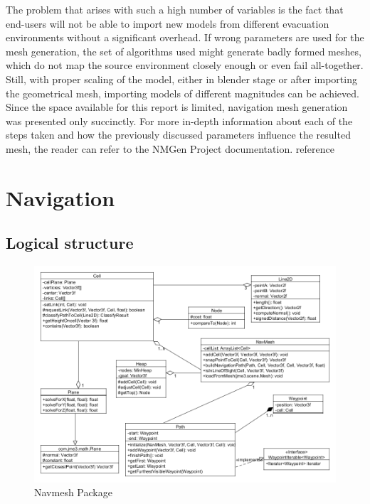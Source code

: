 The problem that arises with such a high number of variables is the fact that end-users will not be able to import new models from different evacuation environments without a significant overhead. If wrong parameters are used for the mesh generation, the set of algorithms used might generate badly formed meshes, which do not map the source environment closely enough or even fail all-together.
Still, with proper scaling of the model, either in blender stage or after importing the geometrical mesh, importing models of different magnitudes can be achieved.
Since the space available for this report is limited, navigation mesh generation was presented only succinctly. For more in-depth information about each of the steps taken and how the previously discussed parameters influence the resulted mesh, the reader can refer to the NMGen Project documentation. {reference}
\section{Navigation}

\subsection{Logical structure}

\begin{figure}[H]
	\centering
	\includegraphics[width=1\textwidth]{../images/navmesh.png}
	\caption{Navmesh Package}
	\label{fig:navmesh_package}
\end{figure}

